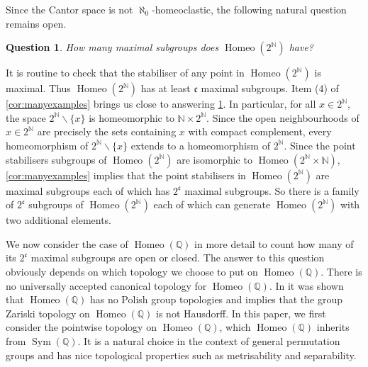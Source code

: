 \documentclass[11pt]{amsart}
\newtheorem{question}[theorem]{Question}
\theoremstyle{definition}
\newcommand{\Homeo}{\operatorname{Homeo}}
\newcommand{\N}{\mathbb N}
\newcommand{\Q}{\mathbb Q}
\newcommand{\Sym}{\operatorname{Sym}}
\begin{document}
Since the Cantor space is not \(\aleph_0\)-homeoclastic, the following natural question remains open.
\begin{question}\label{question_cantor}
    How many maximal subgroups does \(\operatorname{Homeo}(2^\N)\) have?
\end{question}
It is routine to check that the stabiliser of any point in \(\operatorname{Homeo}(2^\N)\) is maximal. Thus \(\operatorname{Homeo}(2^\N)\) has at least \(\mathfrak{c}\) maximal subgroups. Item (4) of \cref{cor:manyexamples} brings us close to answering \cref{question_cantor}. In particular, for all \(x \in 2^\N\), the space \(2^\N\backslash \{x\}\) is homeomorphic to \(\N \times 2^{\N}\). 
Since the open neighbourhoods of \(x\in 2^{\N}\) are precisely the sets containing \(x\) with compact complement, every homeomorphism of \(2^\N\backslash \{x\}\) extends to a homeomorphism of \(2^\N\). 
Since the point stabilisers subgroups of $\Homeo(2^\N)$ are isomorphic to $\Homeo(2^\N\times \N)$, \cref{cor:manyexamples} implies that the point stabilisers in \(\operatorname{Homeo}(2^\N)\) are maximal subgroups each of which has \(2^{\mathfrak{c}}\) maximal subgroups. So there is a family of \(2^{\mathfrak{c}}\) subgroups of \(\Homeo(2^\N)\) each of which can generate \(\Homeo(2^\N)\) with two additional elements.%


We now consider the case of $\Homeo(\Q)$ in more detail to count how many of its $2^{\mathfrak{c}}$ maximal subgroups are open or closed. The answer to this question obviously depends on which topology we choose to put on $\Homeo(\Q)$. There is no universally accepted canonical topology for $\Homeo(\Q)$. In 
\cite{Rosendal} it was shown  that $\Homeo(\Q)$ has no Polish group topologies and
\cite[Theorem 1.4]{E} implies that the group Zariski topology on \(\operatorname{Homeo}(\Q)\) is not Hausdorff.
In this paper, we first consider the pointwise topology on $\Homeo(\Q)$, which $\Homeo(\Q)$ inherits from $\Sym(\Q)$. It is a natural choice in the context of general permutation groups and has nice topological properties such as metrisability and separability.  
\end{document}
